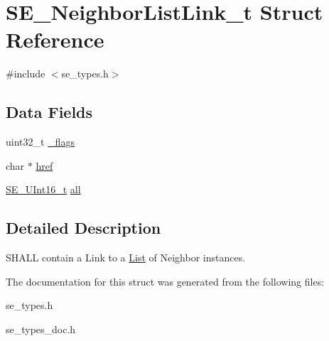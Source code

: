 \hypertarget{structSE__NeighborListLink__t}{}\section{S\+E\+\_\+\+Neighbor\+List\+Link\+\_\+t Struct Reference}
\label{structSE__NeighborListLink__t}


{\ttfamily \#include $<$se\+\_\+types.\+h$>$}

\subsection*{Data Fields}
\begin{DoxyCompactItemize}
\item 
uint32\+\_\+t \hyperlink{group__NeighborListLink_gaba3f6f896c85e0c25653154019dd1471}{\+\_\+flags}
\item 
char $\ast$ \hyperlink{group__NeighborListLink_ga5486b4efff053b4817879fd020db5f42}{href}
\item 
\hyperlink{group__UInt16_gac68d541f189538bfd30cfaa712d20d29}{S\+E\+\_\+\+U\+Int16\+\_\+t} \hyperlink{group__NeighborListLink_gabbd6ebe746c9d4582fc7f972ac1be6c5}{all}
\end{DoxyCompactItemize}


\subsection{Detailed Description}
S\+H\+A\+LL contain a Link to a \hyperlink{structList}{List} of Neighbor instances. 

The documentation for this struct was generated from the following files\+:\begin{DoxyCompactItemize}
\item 
se\+\_\+types.\+h\item 
se\+\_\+types\+\_\+doc.\+h\end{DoxyCompactItemize}
